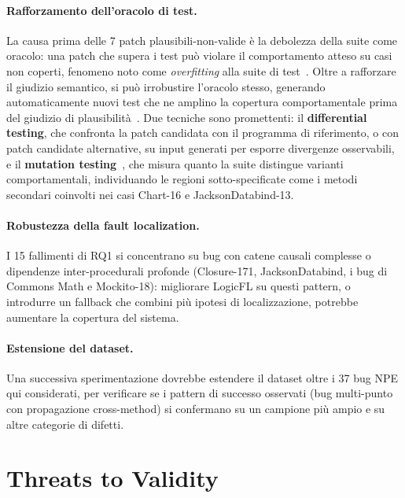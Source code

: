 \paragraph{Rafforzamento dell'oracolo di test.} La causa prima delle 7 patch plausibili-non-valide è
la debolezza della suite come oracolo: una patch che supera i test può violare il comportamento atteso
su casi non coperti, fenomeno noto come \textit{overfitting} alla suite di test~\cite{smith2015overfitting}.
Oltre a rafforzare il giudizio semantico, si può irrobustire l'oracolo stesso, generando automaticamente
nuovi test che ne amplino la copertura comportamentale prima del giudizio di
plausibilità~\cite{yang2017better}. Due tecniche sono promettenti: il \textbf{differential testing}, che
confronta la patch candidata con il programma di riferimento, o con patch candidate alternative, su
input generati per esporre divergenze osservabili, e il \textbf{mutation testing}~\cite{jia2011analysis},
che misura quanto la suite distingue varianti comportamentali, individuando le regioni sotto-specificate
come i metodi secondari coinvolti nei casi Chart-16 e JacksonDatabind-13.

\paragraph{Robustezza della fault localization.} I 15 fallimenti di RQ1 si concentrano su bug con
catene causali complesse o dipendenze inter-procedurali profonde
(\mbox{Closure-171}, JacksonData\-bind, i bug di Commons Math e \mbox{Mockito-18}):
migliorare LogicFL su questi pattern, o introdurre un fallback che combini più ipotesi di
localizzazione, potrebbe aumentare la copertura del sistema.

\paragraph{Estensione del dataset.} Una successiva sperimentazione dovrebbe estendere il dataset oltre
i 37 bug NPE qui considerati, per verificare se i pattern di successo osservati (bug multi-punto con
propagazione cross-method) si confermano su un campione più ampio e su altre categorie di difetti.

\section{Threats to Validity}

